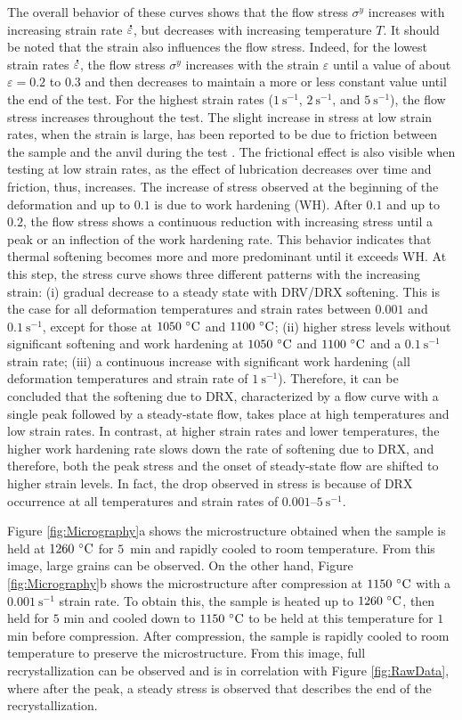 \documentclass[metals,article,accept,pdftex,moreauthors]{Definitions/mdpi}
\DeclareRobustCommand{\mdot}[1]{\accentset{\mbox{\bfseries .}}{#1}}
\DeclareRobustCommand{\ps}{\text{s}^{-1}}
\begin{document}
The overall behavior of these curves shows that the flow stress $\sigma^y$ increases with increasing strain rate $\mdot\varepsilon$, but decreases with increasing temperature $T$.
It should be noted that the strain also influences the flow stress.
Indeed, for the lowest strain rates $\mdot\varepsilon$, the flow stress $\sigma^y$ increases with the strain $\varepsilon$ until a value of about $\varepsilon=0.2$ to $0.3$ and then decreases to maintain a more or less constant value until the end of the test.
For the highest strain rates ($1~\ps$, $2~\ps$, and $5~\ps$), the flow stress increases throughout the test.
The slight increase in stress at low strain rates, when the strain is large, has been reported to be due to friction between the sample and the anvil during the test \cite{galos2022review}.
The frictional effect is also visible when testing at low strain rates, as the effect of lubrication decreases over time and friction, thus, increases.
The increase of stress observed at the beginning of the deformation and up to $0.1$ is due to work hardening (WH).
After $0.1$ and up to $0.2$, the flow stress shows a continuous reduction with increasing stress until a peak or an inflection of the work hardening rate.
This behavior indicates that thermal softening becomes more and more predominant until it exceeds WH.
At this step, the stress curve shows three different patterns with the increasing strain: (i) gradual decrease to a steady state with DRV/DRX softening.
This is the case for all deformation temperatures and strain rates between $0.001$ and $0.1~\ps$, except for those at $1050~\celsius$ and $1100~\celsius$; (ii) higher stress levels without significant softening and work hardening at $1050~\celsius$ and $1100~\celsius$ and a $0.1~\ps$ strain rate; (iii) a continuous increase with significant work hardening (all deformation temperatures and strain rate of $1~\ps$).
Therefore, it can be concluded that the softening due to DRX, characterized by a flow curve with a single peak followed by a steady-state flow, takes place at high temperatures and low strain rates.
In contrast, at higher strain rates and lower temperatures, the higher work hardening rate slows down the rate of softening due to DRX, and therefore, both the peak stress and the onset of steady-state flow are shifted to higher strain levels.
In fact, the drop observed in
stress is because of DRX occurrence at all temperatures and strain rates of $0.001$--$5~\ps$.

Figure \ref{fig:Micrography}a shows the microstructure obtained when the sample is held at $1260~\celsius$ for $5$~min and rapidly cooled to room temperature. From this image, large grains can be observed.
On the other hand, Figure \ref{fig:Micrography}b shows the microstructure after compression at $1150~\celsius$ with a $0.001~\ps$ strain rate.
To obtain this, the sample is heated up to $1260~\celsius$, then held for $5$ min and cooled down to $1150~\celsius$ to be held at this temperature for $1$ min before compression.
After compression, the sample is rapidly cooled to room temperature to preserve the microstructure.
From this image, full recrystallization can be observed and is in correlation with Figure \ref{fig:RawData}, where after the peak, a steady stress is observed that describes the end of the recrystallization.
\end{document}
